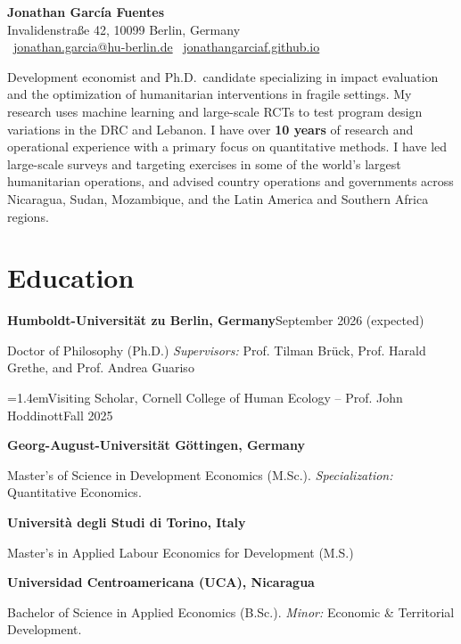 \documentclass[10pt]{article}
\newcommand{\dt}[1]{\textcolor{cvgrey}{#1}}                    %
\newcommand{\eduline}[2]{\textbf{#1}\hfill\dt{#2}\par}         %
\newcommand{\indentdate}[2]{{\leftskip=1.4em\noindent\ignorespaces#1\hfill\dt{#2}\par}}
\newcommand{\gap}{\vspace{6.5pt}}
\begin{document}
\begin{center}
  {\LARGE\bfseries Jonathan García Fuentes}\\[0.35em]
  Invalidenstraße 42, 10099 Berlin, Germany\\[0.25em]
  \faEnvelope~\href{mailto:jonathan.garcia@hu-berlin.de}{\textcolor{cvlink}{jonathan.garcia@hu-berlin.de}}\qquad
  \faGithub~\href{https://jonathangarciaf.github.io}{\textcolor{cvlink}{jonathangarciaf.github.io}}
\end{center}

\vspace{4pt}
Development economist and Ph.D.\ candidate specializing in impact evaluation 
and the optimization of humanitarian interventions in fragile settings. 
My research uses machine learning and large-scale RCTs to test program design 
variations in the DRC and Lebanon. 
I have over \textbf{10 years} of research and operational experience with a primary 
focus on quantitative methods. I have led large-scale surveys and targeting 
exercises in some of the world's largest humanitarian operations, and advised 
country operations and governments across Nicaragua, Sudan, Mozambique, and 
the Latin America and Southern Africa regions.
\vspace{4pt}


\section{Education}
\eduline{Humboldt-Universität zu Berlin, Germany}{September 2026 (expected)}
Doctor of Philosophy (Ph.D.) \textit{Supervisors:} Prof. Tilman Brück, Prof. Harald Grethe, and Prof. Andrea Guariso\par
\indentdate{Visiting Scholar, Cornell College of Human Ecology -- Prof. John Hoddinott}{Fall 2025}
\gap
\eduline{Georg-August-Universität Göttingen, Germany}{}
Master's of Science in Development Economics (M.Sc.). \textit{Specialization:} Quantitative Economics.\par
\gap
\eduline{Università degli Studi di Torino, Italy}{}
Master's in Applied Labour Economics for Development (M.S.)\par
\gap
\eduline{Universidad Centroamericana (UCA), Nicaragua}{}
Bachelor of Science in Applied Economics (B.Sc.). \textit{Minor:} Economic \& Territorial Development.\par
\end{document}
